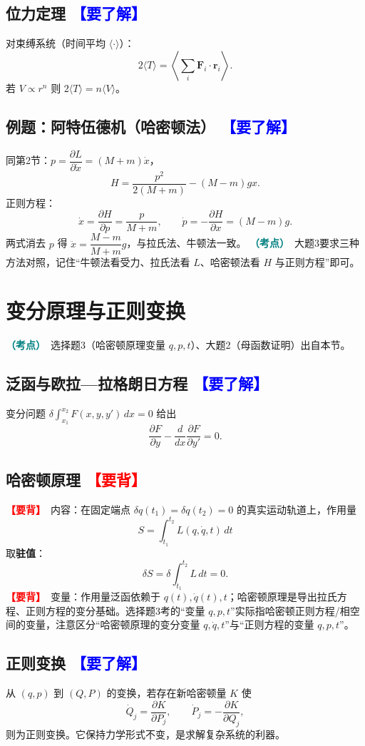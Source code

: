 \documentclass[UTF8,a4paper,11pt]{ctexart}
\newcommand{\bp}[1]{\textcolor{red}{\textbf{【要背】}}\ #1}
\newcommand{\uf}[1]{\textcolor{blue}{\textbf{【要了解】}}\ #1}
\newcommand{\imp}[1]{\textcolor{teal}{\textbf{（考点）}}\ #1}
\begin{document}
\subsection{位力定理 \uf{}}
对束缚系统（时间平均 $\langle\cdot\rangle$）：
\[
2\langle T\rangle=\left\langle\sum_i \bm F_i\cdot\bm r_i\right\rangle.
\]
若 $V\propto r^n$ 则 $2\langle T\rangle=n\langle V\rangle$。

\subsection{例题：阿特伍德机（哈密顿法） \uf{}}
同第2节：$p=\dfrac{\partial L}{\partial\dot x}=(M+m)\dot x$，
\[
H=\frac{p^2}{2(M+m)}-(M-m)gx.
\]
正则方程：
\[
\dot x=\frac{\partial H}{\partial p}=\frac{p}{M+m},\qquad
\dot p=-\frac{\partial H}{\partial x}=(M-m)g.
\]
两式消去 $p$ 得 $\ddot x=\dfrac{M-m}{M+m}g$，与拉氏法、牛顿法一致。
\imp{大题3要求三种方法对照，记住“牛顿法看受力、拉氏法看 $L$、哈密顿法看 $H$ 与正则方程”即可。}

\section{变分原理与正则变换}
\imp{选择题3（哈密顿原理变量 $q,p,t$）、大题2（母函数证明）出自本节。}

\subsection{泛函与欧拉—拉格朗日方程 \uf{}}
变分问题 $\delta\!\int_{x_1}^{x_2}F(x,y,y')\,dx=0$ 给出
\[
\frac{\partial F}{\partial y}-\frac{d}{dx}\frac{\partial F}{\partial y'}=0.
\]

\subsection{哈密顿原理 \bp{}}
\bp{内容}：在固定端点 $\delta q(t_1)=\delta q(t_2)=0$ 的真实运动轨道上，作用量
\[
S=\int_{t_1}^{t_2}L(q,\dot q,t)\,dt
\]
取\textbf{驻值}：
\[
\boxed{\delta S=\delta\int_{t_1}^{t_2}L\,dt=0.}
\]
\bp{变量}：作用量泛函依赖于 $q(t),\dot q(t),t$；哈密顿原理是导出拉氏方程、正则方程的变分基础。选择题3考的“变量 $q,p,t$”实际指哈密顿正则方程/相空间的变量，注意区分“哈密顿原理的变分变量 $q,\dot q,t$”与“正则方程的变量 $q,p,t$”。

\subsection{正则变换 \uf{}}
从 $(q,p)$ 到 $(Q,P)$ 的变换，若存在新哈密顿量 $K$ 使
\[
\dot Q_j=\frac{\partial K}{\partial P_j},\qquad
\dot P_j=-\frac{\partial K}{\partial Q_j},
\]
则为正则变换。它保持力学形式不变，是求解复杂系统的利器。
\end{document}
